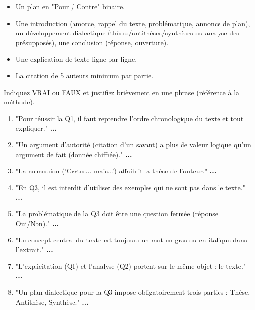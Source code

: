 \documentclass[11pt]{article}
\newcommand{\cle}[1]{{\popxbold\color{popdark}#1}}
\begin{document}
\begin{exercice}
\begin{enumerate}
    \begin{itemize}
        \item[A)] Un plan en "Pour / Contre" binaire.
        \item[B)] Une introduction (amorce, rappel du texte, \cle{problématique}, annonce de plan), un développement dialectique (thèses/antithèses/synthèses ou analyse des présupposés), une conclusion (réponse, ouverture).
        \item[C)] Une explication de texte ligne par ligne.
        \item[D)] La citation de 5 auteurs minimum par partie.
    \end{itemize}
\end{enumerate}
\end{exercice}

\begin{exercice}
Indiquez VRAI ou FAUX et justifiez brièvement en une phrase (référence à la méthode).
\begin{enumerate}
    \item "Pour réussir la Q1, il faut reprendre l'ordre chronologique du texte et tout expliquer." \hfill \textbf{...}
    \item "Un \cle{argument d'autorité} (citation d'un savant) a plus de valeur logique qu'un \cle{argument de fait} (donnée chiffrée)." \hfill \textbf{...}
    \item "La \cle{concession} ('Certes... mais...') affaiblit la thèse de l'auteur." \hfill \textbf{...}
    \item "En Q3, il est interdit d'utiliser des exemples qui ne sont pas dans le texte." \hfill \textbf{...}
    \item "La \cle{problématique} de la Q3 doit être une question fermée (réponse Oui/Non)." \hfill \textbf{...}
    \item "Le \cle{concept} central du texte est toujours un mot en gras ou en italique dans l'extrait." \hfill \textbf{...}
    \item "L'\cle{explicitation} (Q1) et l'\cle{analyse} (Q2) portent sur le même objet : le texte." \hfill \textbf{...}
    \item "Un \cle{plan dialectique} pour la Q3 impose obligatoirement trois parties : Thèse, Antithèse, Synthèse." \hfill \textbf{...}
\end{enumerate}
\end{exercice}
\end{document}
